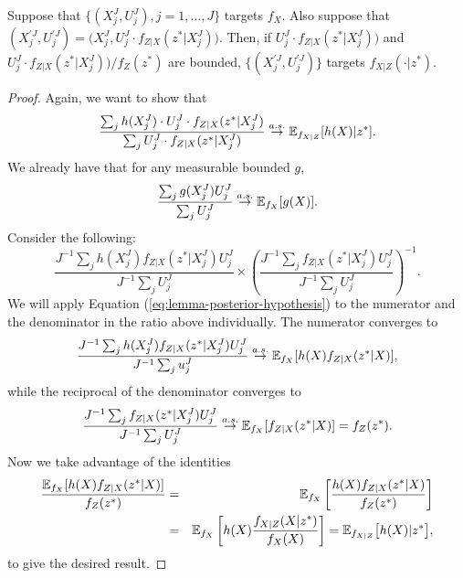 \begin{lem}
    \label{lem:posterior-proper-weights}
    Suppose that $\{(X_j^J,U_j^J),j=1,\dots,J\}$ targets $f_X$. Also suppose that $(X^{\prime J}_j,U^{\prime J}_j) = \big(X_j^J,U_j^J \cdot f_{Z|X}(z^*|X_j^J)\big)$. Then, if $U_j^J \cdot f_{Z|X}(z^*|X_j^J)\big)$ and $U_j^J \cdot f_{Z|X}(z^*|X_j^J)\big) / f_Z(z^*)$ are bounded, $\{(X^{\prime J}_j,U^{\prime J}_j)\}$ targets $f_{X|Z}(\cdot | z^*)$.
\end{lem}

\begin{proof}
    Again, we want to show that
     \begin{equation}\frac{\sum_j h(X_j^J) \cdot U_j^J \cdot f_{Z|X}(z^*|X_j^J)}{\sum_j U_j^J \cdot f_{Z|X}(z^*|X_j^J)} \stackrel{a.s.}{\to} \mathbb{E}_{f_{X|Z}}[h(X)|z^*].\end{equation}
    We already have that for any measurable bounded $g$,
    \begin{equation}
        \frac{\sum_j g(X_j^J)U_j^J}{\sum_j U_j^J} \stackrel{a.s.}{\to} \mathbb{E}_{f_X}[g(X)].
        \label{eq:lemma-posterior-hypothesis}
    \end{equation}
    Consider the following:
    \begin{equation}
    \frac{J^{-1} \sum_j h(X_j^J) f_{Z|X}(z^*|X_j^J) {U}_j^{J}}{J^{-1} \sum_j {U}_j^{J}}
    \times \left( \frac{J^{-1} \sum_j f_{Z|X}(z^*|X_j^J) {U}_j^{J}}{J^{-1} \sum_j {U}_j^{J}} \right)^{-1}.
    \end{equation}
    We will apply Equation (\ref{eq:lemma-posterior-hypothesis}) to the numerator and the denominator in the ratio above individually. The numerator converges to 
    \begin{equation}
    \frac{J^{-1} \sum_j h(X_j^J) f_{Z|X}(z^*|X_j^J) {U}_j^{J}}{J^{-1} \sum_j {u}_j^{J}} \stackrel{a.s.}{\to} \mathbb{E}_{f_X}[h(X)f_{Z|X}(z^*|X)],
    \end{equation}
    while the reciprocal of the denominator converges to 
    \begin{equation} 
    \frac{J^{-1} \sum_j f_{Z|X}(z^*|X_j^J) {U}_j^{J}}{J^{-1} \sum_j {U}_j^{J}}  \stackrel{a.s.}{\to} \mathbb{E}_{f_X}[f_{Z|X}(z^*|X)] = f_Z(z^*).
    \end{equation}
    Now we take advantage of the identities
    \begin{eqnarray}
    \frac{\mathbb{E}_{f_X}[h(X)f_{Z|X}(z^*|X)]}{f_Z(z^*)} &=& \mathbb{E}_{f_X}\left[\frac{h(X)f_{Z|X}(z^*|X)}{f_Z(z^*)}\right] 
    \\
    &=& \mathbb{E}_{f_X}\left[h(X)\frac{f_{X|Z}(X|z^*)}{f_X(X)}\right] =  \mathbb{E}_{f_{X|Z}}\big[h(X)|z^*\big],
    \end{eqnarray}
    to give the desired result.
    

\end{proof}
